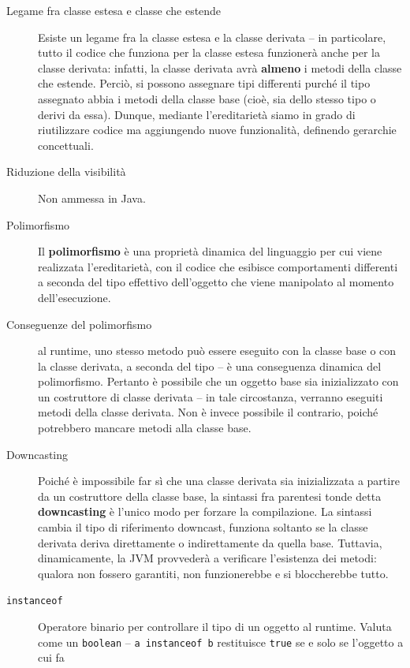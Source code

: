 \documentclass[\fontsizeclass,twocolumn]{\classname}
\theoremstyle{definition}
\theoremstyle{definition}
\begin{document}
\begin{description}
    \item[Legame fra classe estesa e classe che estende] Esiste un legame fra
        la classe estesa e la classe derivata -- in particolare, tutto il
        codice che funziona per la classe estesa funzionerà anche per la classe
        derivata: infatti, la classe derivata avrà \textbf{almeno} i metodi
        della classe che estende. Perciò, si possono assegnare tipi differenti
        purché il tipo assegnato abbia i metodi della classe base (cioè, sia
        dello stesso tipo o derivi da essa). Dunque, mediante l'ereditarietà
        siamo in grado di riutilizzare codice ma aggiungendo nuove
        funzionalità, definendo gerarchie concettuali.
    \item[Riduzione della visibilità] Non ammessa in Java.
    \item[Polimorfismo] Il \textbf{polimorfismo} è una proprietà dinamica del
        linguaggio per cui viene realizzata l'ereditarietà, con il codice che
        esibisce comportamenti differenti a seconda del tipo effettivo
        dell'oggetto che viene manipolato al momento dell'esecuzione.
    \item[Conseguenze del polimorfismo] al runtime, uno stesso metodo può
        essere eseguito con la classe base o con la classe derivata, a seconda
        del tipo -- è una conseguenza dinamica del polimorfismo. Pertanto è
        possibile che un oggetto base sia inizializzato con un costruttore di
        classe derivata -- in tale circostanza, verranno eseguiti metodi della
        classe derivata. Non è invece possibile il contrario, poiché potrebbero
        mancare metodi alla classe base.
    \item[Downcasting] Poiché è impossibile far sì che una classe derivata sia
        inizializzata a partire da un costruttore della classe base, la
        sintassi fra parentesi tonde detta \textbf{downcasting} è l'unico modo
        per forzare la compilazione. La sintassi cambia il tipo di riferimento
        downcast, funziona soltanto se la classe derivata deriva direttamente o
        indirettamente da quella base. Tuttavia, dinamicamente, la JVM
        provvederà a verificare l'esistenza dei metodi: qualora non fossero
        garantiti, non funzionerebbe e si bloccherebbe tutto.
    \item[\texttt{instanceof}] Operatore binario per controllare il tipo di un
        oggetto al runtime. Valuta come un \texttt{boolean} -- \texttt{a
        instanceof b} restituisce \texttt{true} se e solo se l'oggetto a cui fa

\end{description}
\end{document}
